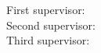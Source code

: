 \thispagestyle{empty}


\begin{flushleft}
    {\large
     First supervisor:  \getSupervisorOne \\[1mm]
     Second supervisor: \getSupervisorTwo \\[1mm]
     Third supervisor:  \getSupervisorThree \\
     }
\end{flushleft}

\cleardoublepage{}
